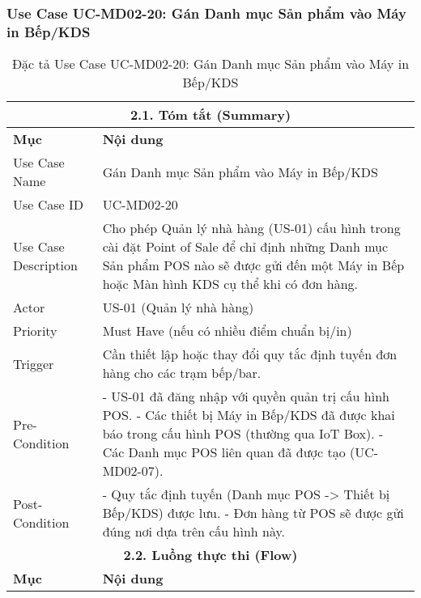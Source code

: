 \subsubsection{Use Case UC-MD02-20: Gán Danh mục Sản phẩm vào Máy in Bếp/KDS}

\begin{longtable}{|m{4cm}|p{11cm}|}
\caption{Đặc tả Use Case UC-MD02-20: Gán Danh mục Sản phẩm vào Máy in Bếp/KDS} \label{tab:uc_md02_20_revised} \\
\hline
\multicolumn{2}{|c|}{\textbf{2.1. Tóm tắt (Summary)}} \\
\hline
\textbf{Mục} & \textbf{Nội dung} \\
\hline
\endhead %
\hline
\endfoot %
\hline
\endlastfoot %
Use Case Name & Gán Danh mục Sản phẩm vào Máy in Bếp/KDS \\
\hline
Use Case ID & UC-MD02-20 \\
\hline
Use Case Description & Cho phép Quản lý nhà hàng (US-01) cấu hình trong cài đặt Point of Sale để chỉ định những Danh mục Sản phẩm POS nào sẽ được gửi đến một Máy in Bếp hoặc Màn hình KDS cụ thể khi có đơn hàng. \\
\hline
Actor & US-01 (Quản lý nhà hàng) \\
\hline
Priority & Must Have (nếu có nhiều điểm chuẩn bị/in) \\
\hline
Trigger & Cần thiết lập hoặc thay đổi quy tắc định tuyến đơn hàng cho các trạm bếp/bar. \\
\hline
Pre-Condition & - US-01 đã đăng nhập với quyền quản trị cấu hình POS. \newline - Các thiết bị Máy in Bếp/KDS đã được khai báo trong cấu hình POS (thường qua IoT Box). \newline - Các Danh mục POS liên quan đã được tạo (UC-MD02-07). \\
\hline
Post-Condition & - Quy tắc định tuyến (Danh mục POS -> Thiết bị Bếp/KDS) được lưu. \newline - Đơn hàng từ POS sẽ được gửi đúng nơi dựa trên cấu hình này. \\
\hline
\multicolumn{2}{|c|}{\textbf{2.2. Luồng thực thi (Flow)}} \\
\hline
\textbf{Mục} & \textbf{Nội dung} \\
\hline

\end{longtable}
